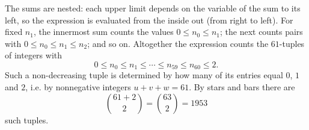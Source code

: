 The sums are nested: each upper limit depends on the variable of the sum to its left, so the expression is evaluated from the inside out (from right to left). For fixed $n_1$, the innermost sum counts the values $0\le n_0\le n_1$; the next counts pairs with $0\le n_0\le n_1\le n_2$; and so on. Altogether the expression counts the $61$-tuples of integers with
\[0\le n_0\le n_1\le\cdots\le n_{59}\le n_{60}\le2.\]
Such a non-decreasing tuple is determined by how many of its entries equal $0$, $1$ and $2$, i.e. by nonnegative integers $u+v+w=61$. By stars and bars there are
\[\binom{61+2}{2}=\binom{63}{2}=\boxed{1953}\]
such tuples.
